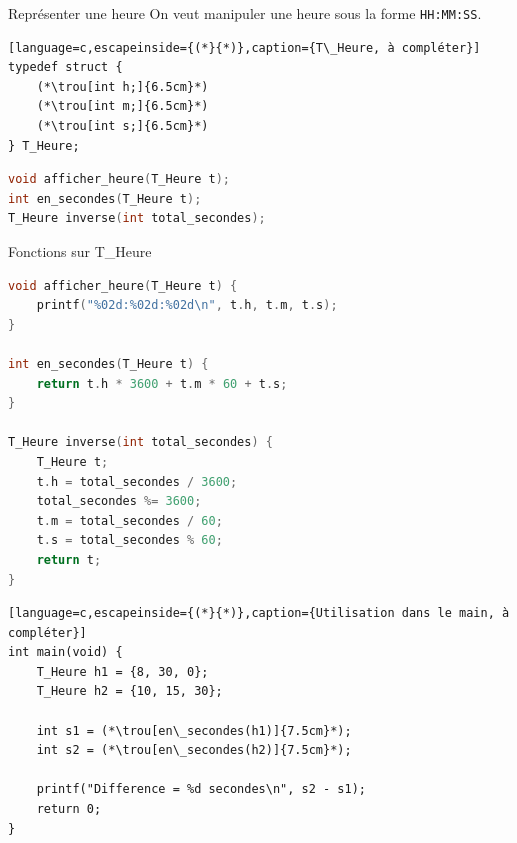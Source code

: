 
\begin{UPSTIexercice}{Représenter une heure}
    On veut manipuler une heure sous la forme \texttt{HH:MM:SS}.


    \begin{lstlisting}[language=c,escapeinside={(*}{*)},caption={T\_Heure, à compléter}]
typedef struct {
    (*\trou[int h;]{6.5cm}*)
    (*\trou[int m;]{6.5cm}*)
    (*\trou[int s;]{6.5cm}*)
} T_Heure;
\end{lstlisting}


    \begin{lstlisting}[language=c,caption={Prototypes}]
void afficher_heure(T_Heure t);
int en_secondes(T_Heure t);
T_Heure inverse(int total_secondes);
\end{lstlisting}

\begin{UPSTIeleveOnlyEnv}
\end{UPSTIeleveOnlyEnv}

\begin{UPSTIcorrectionP}{Fonctions sur T\_Heure}
\begin{lstlisting}[language=c,caption={Correction}]
void afficher_heure(T_Heure t) {
    printf("%02d:%02d:%02d\n", t.h, t.m, t.s);
}

int en_secondes(T_Heure t) {
    return t.h * 3600 + t.m * 60 + t.s;
}

T_Heure inverse(int total_secondes) {
    T_Heure t;
    t.h = total_secondes / 3600;
    total_secondes %= 3600;
    t.m = total_secondes / 60;
    t.s = total_secondes % 60;
    return t;
}
\end{lstlisting}
\end{UPSTIcorrectionP}

    \begin{lstlisting}[language=c,escapeinside={(*}{*)},caption={Utilisation dans le main, à compléter}]
int main(void) {
    T_Heure h1 = {8, 30, 0};
    T_Heure h2 = {10, 15, 30};

    int s1 = (*\trou[en\_secondes(h1)]{7.5cm}*);
    int s2 = (*\trou[en\_secondes(h2)]{7.5cm}*);

    printf("Difference = %d secondes\n", s2 - s1);
    return 0;
}
\end{lstlisting}
\end{UPSTIexercice}

